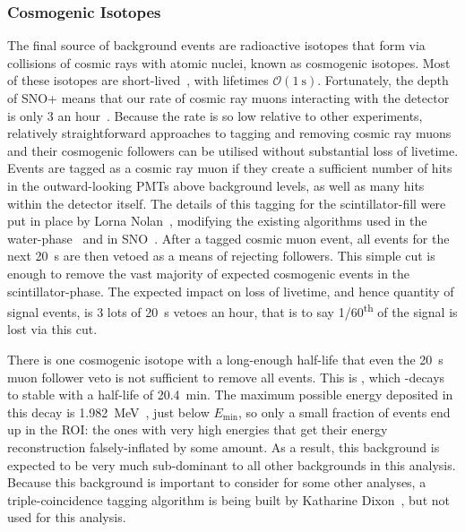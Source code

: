 \subsubsection{Cosmogenic Isotopes}
The final source of background events are radioactive isotopes that form via collisions of cosmic rays with atomic nuclei, known as cosmogenic isotopes. Most of these isotopes are short-lived~\cite{}, %
with lifetimes $\mathcal{O}(\SI{1}{\second})$. Fortunately, the depth of SNO+ means that our rate of cosmic ray muons interacting with the detector is only 3 an hour~\cite{}. %
Because the rate is so low relative to other experiments, relatively straightforward approaches to tagging and removing cosmic ray muons and their cosmogenic followers can be utilised without substantial loss of livetime. Events are tagged as a cosmic ray muon if they create a sufficient number of hits in the outward-looking PMTs above background levels, as well as many hits within the detector itself. The details of this tagging for the scintillator-fill were put in place by Lorna Nolan~\cite{}, %
modifying the existing algorithms used in the water-phase~\cite{} %
and in SNO~\cite{}. %
After a tagged cosmic muon event, all events for the next \SI{20}{\second} are then vetoed as a means of rejecting followers. This simple cut is enough to remove the vast majority of expected cosmogenic events in the scintillator-phase. %
The expected impact on loss of livetime, and hence quantity of signal events, is 3 lots of \SI{20}{\second} vetoes an hour, that is to say 1/60\textsuperscript{th} of the signal is lost via this cut.

There is one cosmogenic isotope with a long-enough half-life that even the \SI{20}{\second} muon follower veto is not sufficient to remove all events. This is , which \ce{\beta+}-decays to stable  with a half-life of \SI{20.4}{\minute}. The maximum possible energy deposited in this decay is \SI{1.982}{\MeV}~\cite{}, %
just below $E_{\textrm{min}}$, so only a small fraction of  events end up in the ROI: the ones with very high energies that get their energy reconstruction falsely-inflated by some amount. As a result, this background is expected to be very much sub-dominant to all other backgrounds in this analysis. Because this background is important to consider for some other analyses, a triple-coincidence tagging algorithm is being built by Katharine Dixon~\cite{}, %
but not used for this analysis.%

